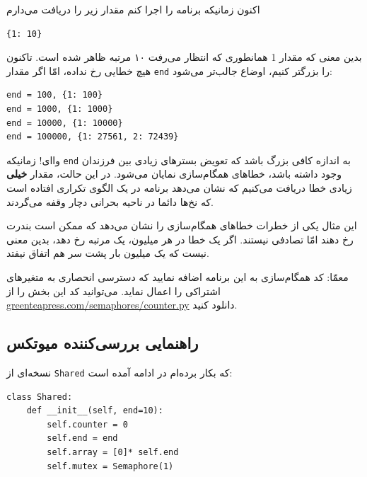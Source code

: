 \documentclass{book}
\newcommand{\clearemptydoublepage}{}%
\begin{document}
    اکنون زمانیکه برنامه را اجرا کنم مقدار زیر را دریافت می‌دارم 

\begin{latin}
\begin{verbatim}
{1: 10}
\end{verbatim}
\end{latin}

    بدین معنی که مقدار 1 همانطوری که انتظار می‌رفت ۱۰ مرتبه ظاهر شده است. 
    تاکنون هیچ خطایی رخ نداده، امّا اگر مقدار {\tt end} را بزرگتر کنیم، اوضاع جالب‌تر می‌شود:‌

\begin{latin}
\begin{verbatim}
end = 100, {1: 100}
end = 1000, {1: 1000}
end = 10000, {1: 10000}
end = 100000, {1: 27561, 2: 72439}
\end{verbatim}
\end{latin}

    واای! زمانیکه {\tt end}  به اندازه کافی بزرگ باشد که تعویض بستر‌های زیادی بین فرزندان وجود داشته باشد، خطاهای همگام‌سازی نمایان می‌شود. 
    در این حالت، مقدار \textbf{خیلی} زیادی خطا دریافت می‌کنیم که نشان می‌دهد برنامه در یک الگوی تکراری افتاده است که نخ‌ها دائما در ناحیه بحرانی 
    دچار وقفه می‌گردند. 

    این مثال یکی از خطرات خطاهای همگام‌سازی را نشان می‌دهد که ممکن است بندرت رخ دهند امّا تصادفی نیستند. 
    اگر یک خطا در هر میلیون، یک مرتبه رخ دهد، بدین معنی نیست که یک میلیون بار پشت سر هم اتفاق نیفتد. 

    معمّا: کد همگام‌سازی به این برنامه اضافه نمایید که دسترسی انحصاری به متغیرهای اشتراکی را اعمال نماید. 
    می‌توانید کد این بخش را از \url{greenteapress.com/semaphores/counter.py} دانلود کنید. 


\clearemptydoublepage
\subsection{راهنمایی بررسی‌کننده میوتکس}

    نسخه‌ای از  {\tt Shared} که بکار برده‌ام در ادامه آمده است: 
\begin{latin}
\begin{lstlisting}
class Shared:
    def __init__(self, end=10):
        self.counter = 0
        self.end = end
        self.array = [0]* self.end
        self.mutex = Semaphore(1)
\end{lstlisting}
\end{latin}
\end{document}
